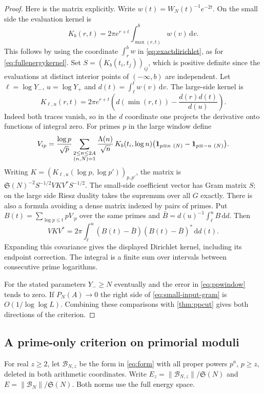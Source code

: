 \documentclass[11pt,a4paper]{article}
\numberwithin{equation}{section}
\newcommand{\SSS}{\mathfrak S}
\newcommand{\ud}{\mathrm d}
\newcommand{\B}{\mathcal B_N}
\begin{document}
\begin{proof}
Here is the matrix explicitly. Write $w(t)=W_N(t)^{-1}e^{-2t}$.
On the small side the evaluation kernel is
\[
 K_b(r,t)=2\pi e^{r+t}\int_{\max(r,t)}^b w(v)\,\ud v .
\]
This follows by using the coordinate $\int_r^b w$ in
\eqref{eq:exactdirichlet}, as for \eqref{eq:fullenergykernel}.
Set $S=(K_b(t_i,t_j))_{ij}$, which is positive definite since
the evaluations at distinct interior points of $(-\infty,b)$
are independent. Let $\ell=\log Y_-$, $u=\log Y_+$ and
$d(t)=\int_\ell^t w(v)\,\ud v$. The large-side kernel is
\[
 K_{\ell,u}(r,t)=2\pi e^{r+t}
   \left(d(\min(r,t))-\frac{d(r)d(t)}{d(u)}\right).
\]
Indeed both traces vanish, so in the $d$ coordinate one projects
the derivative onto functions of integral zero.
For primes $p$ in the large window define
\[
 V_{ip}=\frac{\log p}{\sqrt p}
   \sum_{\substack{2\le n\le 2A\\(n,N)=1}}
   \frac{\Lambda(n)}{\sqrt n}\,K_b(t_i,\log n)
       \bigl({\bf1}_{p\equiv n\ (N)}-{\bf1}_{p\equiv-n\ (N)}\bigr).
\]
Writing $K=(K_{\ell,u}(\log p,\log p'))_{p,p'}$, the matrix is
$\SSS(N)^{-2} S^{-1/2}V K V^* S^{-1/2}$. The small-side
coefficient vector has Gram matrix $S$; on the large side
Riesz duality takes the supremum over all $G$ exactly.
There is also a formula avoiding a dense matrix indexed by
pairs of primes. Put $B(t)=\sum_{\log p\le t}pV_{\cdot p}$
over the same primes and $\bar B=d(u)^{-1}\int_\ell^u B\,\ud d$.
Then
\[
 VKV^*=2\pi\int_\ell^u (B(t)-\bar B)(B(t)-\bar B)^*\,\ud d(t).
\]
Expanding this covariance gives the displayed Dirichlet kernel,
including its endpoint correction. The integral is a finite
sum over intervals between consecutive prime logarithms.

For the stated parameters $Y_-\ge N$ eventually and the error
in \eqref{eq:ppwindow} tends to zero. If $P_N(A)\to0$ the
right side of \eqref{eq:small-input-gram} is $O(1/\log\log L)$.
Combining these comparisons with \cref{thm:ppcut} gives both
directions of the criterion.
\end{proof}

\subsection{A prime-only criterion on primorial moduli}

For real $z\ge2$, let $\mathcal B_{N,z}$ be the form in \cref{eq:form}
with all proper powers $p^a$, $p\ge z$, deleted in both arithmetic
coordinates. Write $E_z=\|\mathcal B_{N,z}\|/\SSS(N)$ and
$E=\|\B\|/\SSS(N)$. Both norms use the full energy space.
\end{document}
